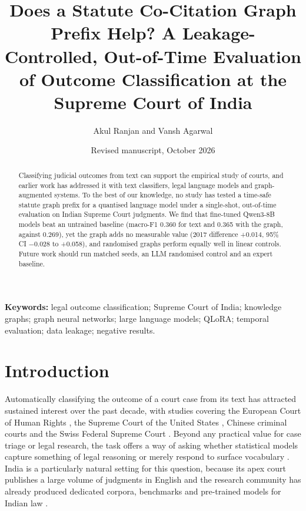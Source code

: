 \documentclass[11pt,a4paper]{article}
\title{Does a Statute Co-Citation Graph Prefix Help? A Leakage-Controlled, Out-of-Time Evaluation of Outcome Classification at the Supreme Court of India}
\author{Akul Ranjan and Vansh Agarwal}
\date{Revised manuscript, October 2026}
\begin{document}
\maketitle

\begin{abstract}
\noindent Classifying judicial outcomes from text can support the empirical study of courts, and earlier work has addressed it with text classifiers, legal language models and graph-augmented systems. To the best of our knowledge, no study has tested a time-safe statute graph prefix for a quantised language model under a single-shot, out-of-time evaluation on Indian Supreme Court judgments. We find that fine-tuned Qwen3-8B models beat an untrained baseline (macro-F1 0.360 for text and 0.365 with the graph, against 0.269), yet the graph adds no measurable value (2017 difference +0.014, 95\% CI $-$0.028 to +0.058), and randomised graphs perform equally well in linear controls. Future work should run matched seeds, an LLM randomised control and an expert baseline.
\end{abstract}

\noindent\textbf{Keywords:} legal outcome classification; Supreme Court of India; knowledge graphs; graph neural networks; large language models; QLoRA; temporal evaluation; data leakage; negative results.

\section{Introduction}
Automatically classifying the outcome of a court case from its text has attracted sustained interest over the past decade, with studies covering the European Court of Human Rights \cite{r1,r2,r3}, the Supreme Court of the United States \cite{r4}, Chinese criminal courts \cite{r5,r6} and the Swiss Federal Supreme Court \cite{r7}. Beyond any practical value for case triage or legal research, the task offers a way of asking whether statistical models capture something of legal reasoning or merely respond to surface vocabulary \cite{r8,r9}. India is a particularly natural setting for this question, because its apex court publishes a large volume of judgments in English and the research community has already produced dedicated corpora, benchmarks and pre-trained models for Indian law \cite{r10,r11,r12}.
\end{document}
